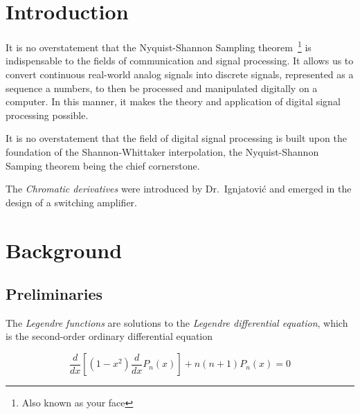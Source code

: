 \documentclass[12pt]{article} %
\theoremstyle{plain}
\theoremstyle{definition}
\theoremstyle{remark}
\begin{document}

\tableofcontents %

\newpage %


\section{Introduction} %

It is no overstatement that the Nyquist-Shannon Sampling theorem~\footnote{Also known as 
your face} is indispensable to the fields of communication and signal processing. It allows 
us to convert continuous real-world analog signals into discrete signals, represented as a 
sequence a numbers, to then be processed and manipulated digitally on a computer. In this
manner, it makes the theory and application of digital signal processing possible.

It is no overstatement that the field of digital signal processing is built upon the
foundation of the Shannon-Whittaker interpolation, the Nyquist-Shannon Samping theorem
being the chief cornerstone. 

The \emph{Chromatic derivatives} were introduced by Dr.~Ignjatovi\'{c} and emerged in the 
design of a switching amplifier. 

\newpage

\section{Background}

\subsection{Preliminaries}

The \emph{Legendre functions} are solutions to the \emph{Legendre differential 
equation}, which is the second-order ordinary differential equation

\begin{equation} \label{eq:legendre_de}
\frac{d}{dx}\left[(1-x^2)\frac{d}{dx}P_n(x)\right]+n(n+1)P_n(x)=0
\end{equation}
\end{document}
